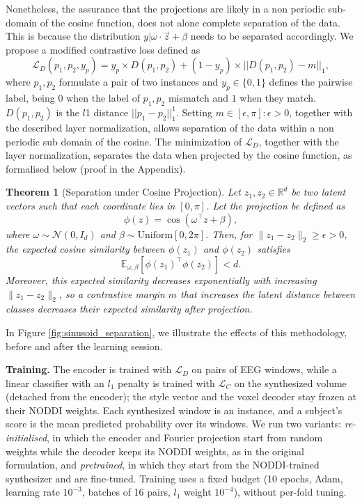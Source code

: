 \documentclass{article}
\newtheorem{theorem}{Theorem}
\begin{document}
Nonetheless, the assurance that the projections are likely in a non periodic sub-domain of the cosine function, does not alone complete separation of the data. This is because the distribution $y|\omega \cdot \vec{z} +\beta$ needs to be separated accordingly. We propose a modified contrastive loss defined as
\begin{equation}\label{equation:contrastive}
    \mathcal{L}_D(p_1, p_2, y_p) = y_p \times D(p_1, p_2) + (1-y_p) \times ||D(p_1,p_2)-m||_1,
\end{equation}
where $p_1, p_2$ formulate a pair of two instances and $y_p \in \{0,1\}$ defines the pairwise label, being $0$ when the label of $p_1, p_2$ mismatch and $1$ when they match. $D(p_1,p_2)$ is the $l$1 distance $||p_1-p_2||_1^1$. Setting $m\in[\epsilon, \pi]: \epsilon>0$, together with the described layer normalization, allows separation of the data within a non periodic sub domain of the cosine. The minimization of $\mathcal{L}_D$, together with the layer normalization, separates the data when projected by the cosine function, as formalised below (proof in the Appendix).
\begin{theorem}[Separation under Cosine Projection]
Let $z_1, z_2 \in \mathbb{R}^d$ be two latent vectors such that each coordinate lies in $[0, \pi]$. Let the projection be defined as
\[
\phi(z) = \cos(\omega^\top z + \beta),
\]
where $\omega \sim \mathcal{N}(0, I_d)$ and $\beta \sim \mathrm{Uniform}[0, 2\pi]$. Then, for $\|z_1 - z_2\|_2 \geq \epsilon > 0$, the expected cosine similarity between $\phi(z_1)$ and $\phi(z_2)$ satisfies
\[
\mathbb{E}_{\omega, \beta}[\phi(z_1)^\top \phi(z_2)] < d.
\]
Moreover, this expected similarity decreases exponentially with increasing $\|z_1 - z_2\|_2$, so a contrastive margin $m$ that increases the latent distance between classes decreases their expected similarity after projection.
\end{theorem}
In Figure \ref{fig:sinusoid_separation}, we illustrate the effects of this methodology, before and after the learning session.

\noindent\textbf{Training.} The encoder is trained with $\mathcal{L}_D$ on pairs of EEG windows, while a linear classifier with an $l_1$ penalty is trained with $\mathcal{L}_C$ on the synthesized volume (detached from the encoder); the style vector and the voxel decoder stay frozen at their NODDI weights. Each synthesized window is an instance, and a subject's score is the mean predicted probability over its windows. We run two variants: \emph{re-initialised}, in which the encoder and Fourier projection start from random weights while the decoder keeps its NODDI weights, as in the original formulation, and \emph{pretrained}, in which they start from the NODDI-trained synthesizer and are fine-tuned. Training uses a fixed budget (10 epochs, Adam, learning rate $10^{-3}$, batches of 16 pairs, $l_1$ weight $10^{-4}$), without per-fold tuning.
\end{document}
